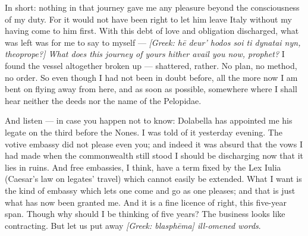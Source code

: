  In short: nothing in that journey gave me any pleasure beyond the consciousness of my duty. For it would not have been right to let him leave Italy without my having come to him first. With this debt of love and obligation discharged, what was left was for me to say to myself --- \textit{[Greek: hē deur' hodos soi ti dynatai nyn, theoprope?] What does this journey of yours hither avail you now, prophet?} I found the vessel altogether broken up --- shattered, rather. No plan, no method, no order. So even though I had not been in doubt before, all the more now I am bent on flying away from here, and as soon as possible, somewhere where I shall hear neither the deeds nor the name of the Pelopidae.

 And listen --- in case you happen not to know: Dolabella has appointed me his legate on the third before the Nones. I was told of it yesterday evening. The votive embassy did not please even you; and indeed it was absurd that the vows I had made when the commonwealth still stood I should be discharging now that it lies in ruins. And free embassies, I think, have a term fixed by the Lex Iulia (Caesar's law on legates' travel) which cannot easily be extended. What I want is the kind of embassy which lets one come and go as one pleases; and that is just what has now been granted me. And it is a fine licence of right, this five-year span. Though why should I be thinking of five years? The business looks like contracting. But let us put away \textit{[Greek: blasphēma] ill-omened words}.
